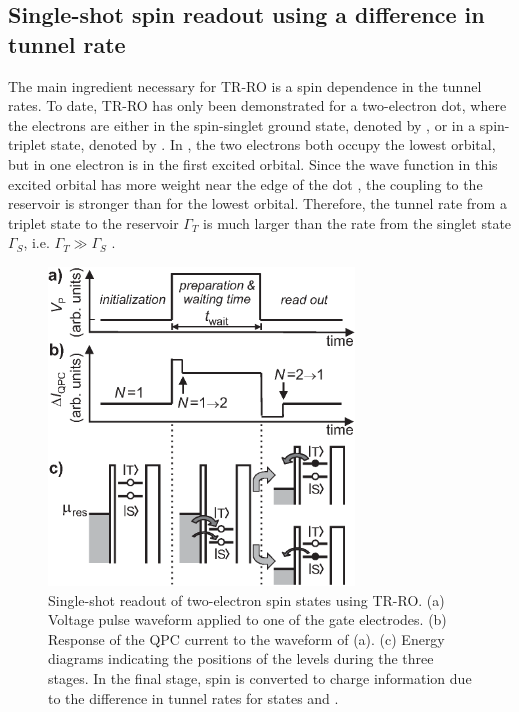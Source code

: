\documentclass[rmp,twocolumn,aps]{revtex4}
\begin{document}
\subsection{Single-shot spin readout using a difference in tunnel rate}
\label{Subsection:TRRO}
The main ingredient necessary for TR-RO is a spin dependence in
the tunnel rates. To date, TR-RO has only been demonstrated for a two-electron dot, where the electrons are either
in the spin-singlet ground state, denoted by , or in a
spin-triplet state, denoted by . In , the two
electrons both occupy the lowest orbital, but in  one
electron is in the first excited orbital. Since the wave function
in this excited orbital has more weight near the edge of the dot
\cite{kouwenhoven01}, the coupling to the reservoir is stronger than
for the lowest orbital. Therefore, the tunnel rate from a triplet
state to the reservoir $\Gamma_T$ is much larger than the rate
from the singlet state $\Gamma_S$, i.e. $\Gamma_T\gg\Gamma_S$
\cite{RonaldMoriond}.

\begin{figure}[htb]
\includegraphics[width=3.2in, clip=true]{hanson_fig17.eps}
\caption{Single-shot readout of two-electron spin states using
TR-RO. (a) Voltage pulse waveform applied to one of the gate
electrodes. (b) Response of the QPC current to the waveform of
(a). (c) Energy diagrams indicating the positions of the levels
during the three stages. In the final stage, spin is converted to
charge information due to the difference in tunnel rates for
states  and .} \label{Fig:TRROpulse}
\end{figure}
\end{document}
